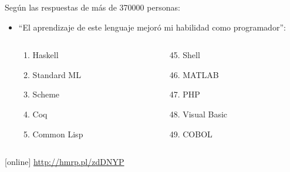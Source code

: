 \documentclass[spanish]{beamer}
\begin{document}

\begin{frame}
  Según las respuestas de más de 370000 personas:
  \begin{itemize}
  \item
    ``El aprendizaje de este lenguaje mejoró mi habilidad como
    programador'':
    \begin{columns}[T]
      \begin{column}{3cm}
        \begin{enumerate}
        \item Haskell
        \item Standard ML
        \item Scheme
        \item Coq
        \item Common Lisp
        \end{enumerate}
      \end{column}
      \begin{column}{3cm}
        \begin{enumerate}
        \setcounter{enumi}{44}
        \item Shell
        \item MATLAB
        \item PHP
        \item Visual Basic
        \item COBOL
        \end{enumerate}
      \end{column}
    \end{columns}
  \end{itemize}
  \begin{thebibliography}{}
  [online]
    \newblock \url{http://hmrp.pl/zdDNYP}
  \end{thebibliography}
\end{frame}

\end{document}
